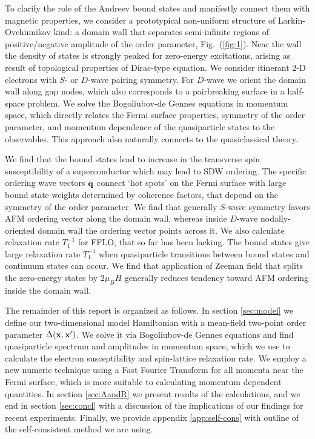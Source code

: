 \documentclass[prb,aps,showpacs,amsmath,twocolumn,10pt]{revtex4-1}
\begin{document}
To clarify the role of the Andreev bound states and manifestly connect them with 
magnetic properties, we consider a prototypical non-uniform
structure of Larkin-Ovchinnikov kind: a domain wall that separates
semi-infinite regions of positive/negative amplitude of the order parameter, 
Fig.~(\ref{fig:1}).
Near the wall the density of states is
strongly peaked for zero-energy excitations, arising as result of topological
properties of Dirac-type equation.\cite{Tanaka2012,Mizushima2016} 
We consider itinerant 2-D electrons with $S$- or $D$-wave pairing symmetry. 
For $D$-wave we orient the domain wall along gap nodes,\cite{Vorontsov2005fflo} 
which also corresponds to a pairbreaking surface in a half-space problem. 
We solve the Bogoliubov-de Gennes equations in momentum space, which directly
relates the Fermi surface properties, symmetry of the order parameter, and
momentum dependence of the quasiparticle states 
to the observables. This approach also naturally connects to the quasiclassical theory. 

We find that the 
bound states lead to increase in the transverse spin susceptibility of
a superconductor 
which may lead to SDW ordering. 
The specific ordering wave vectors ${\bf q}$ connect `hot spots' on the Fermi surface
with large bound state weights determined by coherence factors, 
that depend on the symmetry of the order parameter. 
We find that generally $S$-wave symmetry favors AFM ordering vector along the
domain wall, whereas inside $D$-wave nodally-oriented domain wall the 
ordering vector points across it. 
We also calculate relaxation rate $T_1^{-1}$ for FFLO, that so far has been lacking. 
The bound states give large relaxation rate $T_1^{-1}$ 
when quasiparticle transitions between bound states 
and continuum states can occur. 
We find that application of Zeeman field that splits the zero-energy states by $2\mu_B H$ 
generally reduces tendency toward AFM ordering inside the domain wall. 

The remainder of this report is organized as follows. In section
\ref{sec:model} we define our two-dimensional model Hamiltonian 
with a mean-field two-point order parameter $\Delta({\bf x},{\bf x}')$. 
We solve it via Bogoliubov-de Gennes equations and find quasiparticle spectrum and
amplitudes in momentum space, which we use to calculate the electron susceptibility 
and spin-lattice relaxation rate. We employ a new numeric
technique using a Fast Fourier Transform for all momenta near the Fermi surface, which is more suitable to calculating
momentum dependent quantities. 
In section \ref{sec:AandR} we present results of the calculations, and we end
in section \ref{sec:concl} with a discussion of the implications of our findings for recent experiments. 
Finally, we provide appendix \ref{app:self-cons} with outline of the self-consistent 
method we are using.
\end{document}
